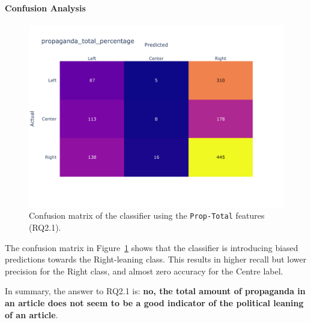 \paragraph{Confusion Analysis}

\begin{figure}[!htbp]
    \centering
    \includegraphics[width=0.75\linewidth]{figures/baly_media_confusion_matrix_propaganda_total_percentage.pdf}
    \caption{Confusion matrix of the classifier using the \texttt{Prop-Total} features (RQ2.1).}
    \label{fig:total_prop_confusion}
\end{figure}

The confusion matrix in Figure~\ref{fig:total_prop_confusion} shows that the classifier is introducing biased predictions towards the Right-leaning class. %
This results in higher recall but lower precision for the Right class, and almost zero accuracy for the Centre label. 

In summary, the answer to RQ2.1 is: \textbf{no, the total amount of propaganda in an article does not seem to be a good indicator of the political leaning of an article}.


